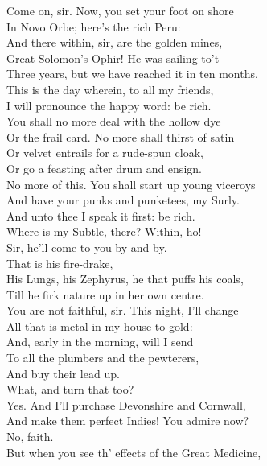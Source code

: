 \documentclass[a4paper,oneside,12pt]{memoir}
\begin{document}
\begin{drama*}
\mammonspeaks Come on, sir. Now, you set your foot on shore\\
In Novo Orbe; here's the rich Peru:\\
And there within, sir, are the golden mines,\\
Great Solomon's Ophir! He was sailing to't\\
Three years, but we have reached it in ten months.\\
This is the day wherein, to all my friends,\\
I will pronounce the happy word: be rich.\\
You shall no more deal with the hollow dye\\
Or the frail card. No more shall thirst of satin\\
Or velvet entrails for a rude-spun cloak,\\
Or go a feasting after drum and ensign.\\
No more of this. You shall start up young viceroys\\
And have your punks and punketees, my Surly.\\
And unto thee I speak it first: be rich.\\
Where is my Subtle, there? Within, ho!\\
\facespeaks {} Sir, he'll come to you by and by.\\
\mammonspeaks {} That is his fire-drake,\\
His Lungs, his Zephyrus, he that puffs his coals,\\
Till he firk nature up in her own centre.\\
You are not faithful, sir. This night, I'll change\\
All that is metal in my house to gold:\\
And, early in the morning, will I send\\
To all the plumbers and the pewterers,\\
And buy their lead up.\\
\surlyspeaks {} What, and turn that too?\\
\mammonspeaks Yes. And I'll purchase Devonshire and Cornwall,\\
And make them perfect Indies! You admire now?\\
\surlyspeaks No, faith.\\
\mammonspeaks {} But when you see th' effects of the Great Medicine,\\

\end{drama*}
\end{document}
